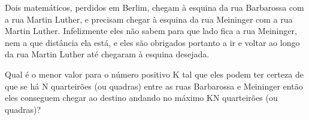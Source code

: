 Dois matemáticos, perdidos em Berlim, chegam à esquina da rua Barbarossa com a rua Martin Luther, e precisam chegar à esquina da rua Meininger com a rua Martin Luther. Infelizmente eles não sabem para que lado fica a rua Meininger, nem a que distância ela está, e eles são obrigados portanto a ir e voltar ao longo da rua Martin Luther até chegaram à esquina desejada.

Qual é o menor valor para o número positivo K tal que eles podem ter certeza de que se há N quarteirões (ou quadras) entre as ruas Barbarossa e Meininger então eles conseguem chegar ao destino andando no máximo KN quarteirões (ou quadras)?